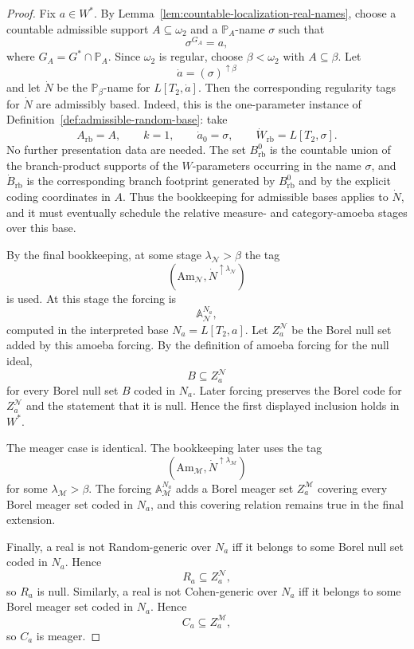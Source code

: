 \documentclass[a4paper,11pt]{article}
\begin{document}
\begin{proof}
Fix $a\in W^\ast$.  By
Lemma~\ref{lem:countable-localization-real-names}, choose a countable
admissible support $A\subseteq\omega_2$ and a $\mathbb P_A$-name $\sigma$ such
that
\[
   \sigma^{G_A}=a,
\]
where $G_A=G^\ast\cap\mathbb P_A$.  Since $\omega_2$ is regular, choose
$\beta<\omega_2$ with $A\subseteq\beta$.  Let
\[
   \dot a=(\sigma)^{\uparrow\beta}
\]
and let $\dot N$ be the $\mathbb P_\beta$-name for $L[T_2,\dot a]$.
Then the corresponding regularity tags for $\dot N$ are admissibly based.  Indeed, this is the
one-parameter instance of Definition~\ref{def:admissible-random-base}: take
\[
   A_{\mathrm{rb}}=A,
   \qquad k=1,
   \qquad \dot a_0=\sigma,
   \qquad \dot W_{\mathrm{rb}}=L[T_2,\sigma].
\]
No further presentation data are needed.  The set \(B^0_{\mathrm{rb}}\) is the
countable union of the branch-product supports of the \(W\)-parameters occurring
in the name \(\sigma\), and \(\dot B_{\mathrm{rb}}\) is the corresponding branch
footprint generated by \(B^0_{\mathrm{rb}}\) and by the explicit coding
coordinates in \(A\).  Thus the bookkeeping for admissible bases applies to
\(\dot N\), and it must eventually schedule the relative measure- and
category-amoeba stages over this base.

By the final bookkeeping, at some stage $\lambda_{\mathcal N}>\beta$ the tag
\[
   (\mathrm{Am}_{\mathcal N},\dot N^{\uparrow\lambda_{\mathcal N}})
\]
is used.  At this stage the forcing is
\[
   \mathbb A_{\mathcal N}^{N_a},
\]
computed in the interpreted base $N_a=L[T_2,a]$.  Let
$Z_a^{\mathcal N}$ be the Borel null set added by this amoeba forcing.  By the
definition of amoeba forcing for the null ideal,
\[
   B\subseteq Z_a^{\mathcal N}
\]
for every Borel null set $B$ coded in $N_a$.  Later forcing preserves the Borel
code for $Z_a^{\mathcal N}$ and the statement that it is null.  Hence the first
displayed inclusion holds in $W^\ast$.

The meager case is identical.  The bookkeeping later uses the tag
\[
   (\mathrm{Am}_{\mathcal M},\dot N^{\uparrow\lambda_{\mathcal M}})
\]
for some $\lambda_{\mathcal M}>\beta$.  The forcing
$\mathbb A_{\mathcal M}^{N_a}$ adds a Borel meager set
$Z_a^{\mathcal M}$ covering every Borel meager set coded in $N_a$, and this
covering relation remains true in the final extension.

Finally, a real is not Random-generic over $N_a$ iff it belongs to some Borel
null set coded in $N_a$.  Hence
\[
   R_a\subseteq Z_a^{\mathcal N},
\]
so $R_a$ is null.  Similarly, a real is not Cohen-generic over $N_a$ iff it
belongs to some Borel meager set coded in $N_a$.  Hence
\[
   C_a\subseteq Z_a^{\mathcal M},
\]
so $C_a$ is meager.
\end{proof}
\end{document}
